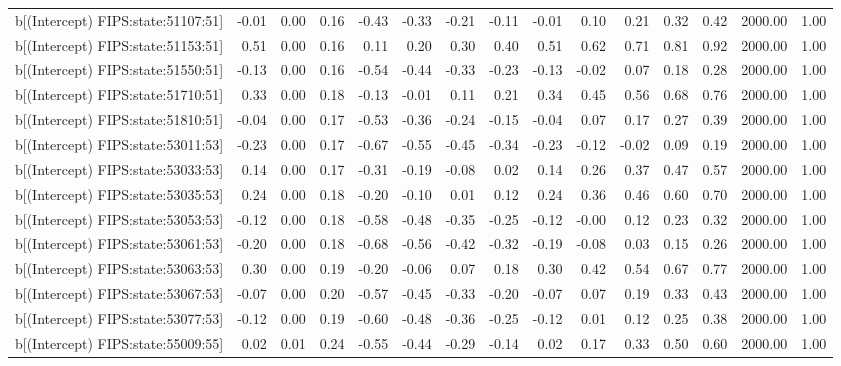 \begin{table}[ht]
\begin{tabular}{rrrrrrrrrrrrrrr}
  b[(Intercept) FIPS:state:51107:51] & -0.01 & 0.00 & 0.16 & -0.43 & -0.33 & -0.21 & -0.11 & -0.01 & 0.10 & 0.21 & 0.32 & 0.42 & 2000.00 & 1.00 \\ 
  b[(Intercept) FIPS:state:51153:51] & 0.51 & 0.00 & 0.16 & 0.11 & 0.20 & 0.30 & 0.40 & 0.51 & 0.62 & 0.71 & 0.81 & 0.92 & 2000.00 & 1.00 \\ 
  b[(Intercept) FIPS:state:51550:51] & -0.13 & 0.00 & 0.16 & -0.54 & -0.44 & -0.33 & -0.23 & -0.13 & -0.02 & 0.07 & 0.18 & 0.28 & 2000.00 & 1.00 \\ 
  b[(Intercept) FIPS:state:51710:51] & 0.33 & 0.00 & 0.18 & -0.13 & -0.01 & 0.11 & 0.21 & 0.34 & 0.45 & 0.56 & 0.68 & 0.76 & 2000.00 & 1.00 \\ 
  b[(Intercept) FIPS:state:51810:51] & -0.04 & 0.00 & 0.17 & -0.53 & -0.36 & -0.24 & -0.15 & -0.04 & 0.07 & 0.17 & 0.27 & 0.39 & 2000.00 & 1.00 \\ 
  b[(Intercept) FIPS:state:53011:53] & -0.23 & 0.00 & 0.17 & -0.67 & -0.55 & -0.45 & -0.34 & -0.23 & -0.12 & -0.02 & 0.09 & 0.19 & 2000.00 & 1.00 \\ 
  b[(Intercept) FIPS:state:53033:53] & 0.14 & 0.00 & 0.17 & -0.31 & -0.19 & -0.08 & 0.02 & 0.14 & 0.26 & 0.37 & 0.47 & 0.57 & 2000.00 & 1.00 \\ 
  b[(Intercept) FIPS:state:53035:53] & 0.24 & 0.00 & 0.18 & -0.20 & -0.10 & 0.01 & 0.12 & 0.24 & 0.36 & 0.46 & 0.60 & 0.70 & 2000.00 & 1.00 \\ 
  b[(Intercept) FIPS:state:53053:53] & -0.12 & 0.00 & 0.18 & -0.58 & -0.48 & -0.35 & -0.25 & -0.12 & -0.00 & 0.12 & 0.23 & 0.32 & 2000.00 & 1.00 \\ 
  b[(Intercept) FIPS:state:53061:53] & -0.20 & 0.00 & 0.18 & -0.68 & -0.56 & -0.42 & -0.32 & -0.19 & -0.08 & 0.03 & 0.15 & 0.26 & 2000.00 & 1.00 \\ 
  b[(Intercept) FIPS:state:53063:53] & 0.30 & 0.00 & 0.19 & -0.20 & -0.06 & 0.07 & 0.18 & 0.30 & 0.42 & 0.54 & 0.67 & 0.77 & 2000.00 & 1.00 \\ 
  b[(Intercept) FIPS:state:53067:53] & -0.07 & 0.00 & 0.20 & -0.57 & -0.45 & -0.33 & -0.20 & -0.07 & 0.07 & 0.19 & 0.33 & 0.43 & 2000.00 & 1.00 \\ 
  b[(Intercept) FIPS:state:53077:53] & -0.12 & 0.00 & 0.19 & -0.60 & -0.48 & -0.36 & -0.25 & -0.12 & 0.01 & 0.12 & 0.25 & 0.38 & 2000.00 & 1.00 \\ 
  b[(Intercept) FIPS:state:55009:55] & 0.02 & 0.01 & 0.24 & -0.55 & -0.44 & -0.29 & -0.14 & 0.02 & 0.17 & 0.33 & 0.50 & 0.60 & 2000.00 & 1.00 \\ 

\end{tabular}
\end{table}

